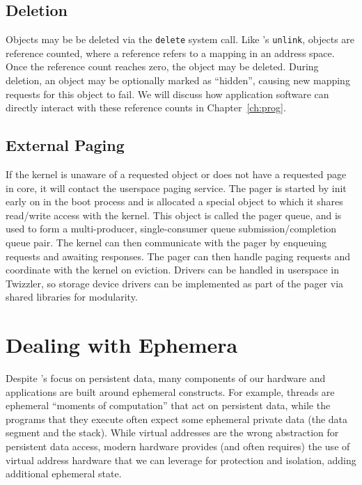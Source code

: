 \subsection{Deletion}

Objects may be be deleted via the \texttt{delete} system call.
Like \unix's \texttt{unlink}, objects are reference counted, where a reference refers to a mapping
in an address space. Once the reference count reaches zero, the object may be deleted. During
deletion, an object may be optionally marked as ``hidden'', causing new mapping requests for this
object to fail. We will discuss how application software can directly interact with these reference counts in Chapter~\ref{ch:prog}.

\subsection{External Paging}

If the kernel is unaware of a requested object or does not have a requested page in core, it will contact the userspace
paging service. The pager is started by init early on in the boot process and is allocated a special object to which it
shares read/write access with the kernel. This object is called the pager queue, and is used to form a multi-producer,
single-consumer queue submission/completion queue pair. The kernel can then communicate with the pager by enqueuing
requests and awaiting responses. The pager can then handle paging requests and coordinate with the kernel on eviction. Drivers can be
handled in userspace in Twizzler, so storage device drivers can be implemented as part of the pager via shared libraries
for modularity.

\section{Dealing with Ephemera}

Despite \Twizzler's focus on persistent data, many components of our hardware and applications are
built around ephemeral constructs. For example, threads are ephemeral ``moments of computation''
that act on persistent data, while the programs that they execute often expect some ephemeral
private data (\eg the data segment and the stack). While virtual addresses are the wrong abstraction
for persistent data access, modern hardware provides (and often requires) the use of virtual address
hardware that we can leverage for protection and isolation, adding additional ephemeral state.

